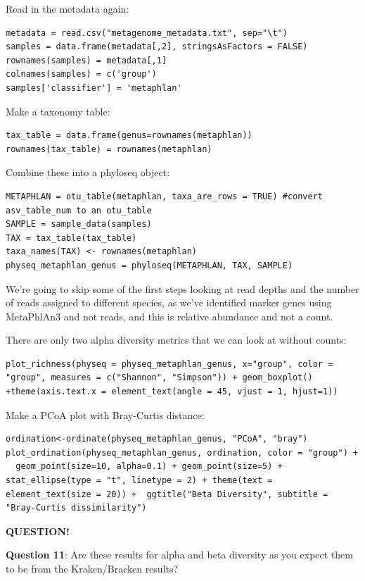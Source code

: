 \documentclass[
]{book}
\newenvironment{bluebox}{
  \definecolor{shadecolor}{RGB}{172, 210, 237}
  \color{white}
  \begin{shaded}}
 {\end{shaded}}
\begin{document}
Read in the metadata again:

\begin{verbatim}
metadata = read.csv("metagenome_metadata.txt", sep="\t")
samples = data.frame(metadata[,2], stringsAsFactors = FALSE)
rownames(samples) = metadata[,1]
colnames(samples) = c('group')
samples['classifier'] = 'metaphlan'
\end{verbatim}

Make a taxonomy table:

\begin{verbatim}
tax_table = data.frame(genus=rownames(metaphlan))
rownames(tax_table) = rownames(metaphlan)
\end{verbatim}

Combine these into a phyloseq object:

\begin{verbatim}
METAPHLAN = otu_table(metaphlan, taxa_are_rows = TRUE) #convert asv_table_num to an otu_table
SAMPLE = sample_data(samples)
TAX = tax_table(tax_table)
taxa_names(TAX) <- rownames(metaphlan)
physeq_metaphlan_genus = phyloseq(METAPHLAN, TAX, SAMPLE)
\end{verbatim}

We're going to skip some of the first steps looking at read depths and the number of reads assigned to different species, as we've identified marker genes using MetaPhlAn3 and not reads, and this is relative abundance and not a count.

There are only two alpha diversity metrics that we can look at without counts:

\begin{verbatim}
plot_richness(physeq = physeq_metaphlan_genus, x="group", color = "group", measures = c("Shannon", "Simpson")) + geom_boxplot() +theme(axis.text.x = element_text(angle = 45, vjust = 1, hjust=1))
\end{verbatim}

Make a PCoA plot with Bray-Curtis distance:

\begin{verbatim}
ordination<-ordinate(physeq_metaphlan_genus, "PCoA", "bray")
plot_ordination(physeq_metaphlan_genus, ordination, color = "group") +
  geom_point(size=10, alpha=0.1) + geom_point(size=5) + stat_ellipse(type = "t", linetype = 2) + theme(text = element_text(size = 20)) +  ggtitle("Beta Diversity", subtitle = "Bray-Curtis dissimilarity")
\end{verbatim}

\begin{bluebox}

\begin{center}
\textbf{QUESTION!}

\end{center}

\textbf{Question 11}: Are these results for alpha and beta diversity as you expect them to be from the Kraken/Bracken results?

\end{bluebox}
\end{document}
